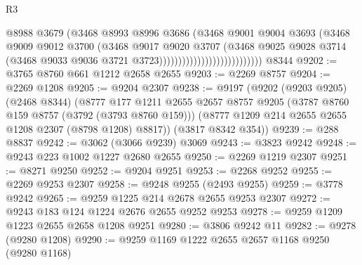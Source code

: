 \begin{lexlean}{R3}
\begin{coremodule}
                                              @8988
                                              @3679
                                              (@3468
                                                @8993
                                                @8996
                                                @3686
                                                (@3468
                                                  @9001
                                                  @9004
                                                  @3693
                                                  (@3468
                                                    @9009
                                                    @9012
                                                    @3700
                                                    (@3468
                                                      @9017
                                                      @9020
                                                      @3707
                                                      (@3468
                                                        @9025
                                                        @9028
                                                        @3714
                                                        (@3468
                                                          @9033
                                                          @9036
                                                          @3721
                                                          @3723)))))))))))))))))))))))))))
    @8344
@9202 := @3765 @8760 @661 @1212 @2658 @2655
@9203 := @2269 @8757
@9204 := @2269 @1208
@9205 := @9204 @2307
@9238 := @9197
    (@9202
      (@9203 @9205)
      (@2468 @8344)
      (@8777
        @177
        @1211
        @2655
        @2657
        @8757
        @9205
        (@3787 @8760 @159 @8757 (@3792 (@3793 @8760 @159)))
        (@8777 @1209 @214 @2655 @2655 @1208 @2307 (@8798 @1208) @8817))
      (@3817 @8342 @354))
@9239 := @288 @8837
@9242 := @3062 (@3066 @9239) @3069
@9243 := @3823 @9242
@9248 := @9243 @223 @1002 @1227 @2680 @2655
@9250 := @2269 @1219 @2307
@9251 := @8271 @9250
@9252 := @9204 @9251
@9253 := @2268 @9252
@9255 := @2269 @9253 @2307
@9258 := @9248 @9255 (@2493 @9255)
@9259 := @3778 @9242
@9265 := @9259 @1225 @214 @2678 @2655 @9253 @2307
@9272 := @9243 @183 @124 @1224 @2676 @2655 @9252 @9253
@9278 := @9259 @1209 @1223 @2655 @2658 @1208 @9251
@9280 := @3806 @9242 @11
@9282 := @9278 (@9280 @1208)
@9290 := @9259 @1169 @1222 @2655 @2657 @1168 @9250 (@9280 @1168)

\end{coremodule}
\end{lexlean}
